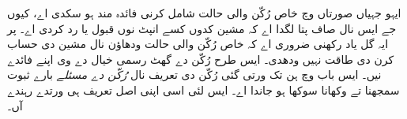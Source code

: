 \documentclass[../../../include/open-logic-section]{subfiles}
\begin{document}
\begin{explain}
ایہو جہیاں صورتاں وچ
خاص رُکّن والی حالت
شامل کرنی فائدہ مند
ہو سکدی اے، کیوں جے
ایس نال صاف پتا لگدا
اے کہ مشین کدوں کسے
انپٹ نوں قبول یا رد
کردی اے۔ پر ایہ گل
یاد رکھنی ضروری اے
کہ خاص رُکّن والی
حالت ودھاؤن نال مشین
دی حساب کرن دی طاقت
نہیں ودھدی۔ ایس طرح
رُکّن دے گھٹ رسمی
خیال دے وی اپنے فائدے
نیں۔ ایس باب وچ ہن
تک ورتی گئی رُکّن
دی تعریف نال
\emph{رُکّن دے مسئلے}
بارے ثبوت سمجھنا تے
وکھانا سوکھا ہو جاندا اے۔ ایس
لئی اسی اپنی اصل
تعریف ہی ورتدے رہندے
آں۔
\end{explain}
\end{document}
